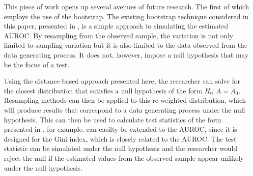 




This piece of work opens up several avenues of future research.
The first of which employs the use of the bootstrap.
The existing bootstrap technique considered in this paper, presented in \citet{proc2011}, is a simple approach to simulating the estimated AUROC.
By resampling from the observed sample, the variation is not only limited to sampling variation but it is also limited to the data observed from the data generating process.
It does not, however, impose a null hypothesis that may be the focus of a test.

Using the distance-based approach presented here,
the researcher can solve for the closest distribution that satisfies a null hypothesis of the form $H_0: A = A_0$.
Resampling methods can then be applied to this re-weighted distribution, which will produce results that correspond to a data generating process under the null hypothesis.
This can then be used to calculate test statistics of the form presented in \citet{davidson2008}, for example.
\citet{davidson2008} can easilty be extended to the AUROC, since it is designed for the Gini index, which is closely related to the AUROC.
The test statistic can be simulated under the null hypothesis and the researcher would reject the null if the estimated values from the observed sample appear unlikely under the null hypothesis.


